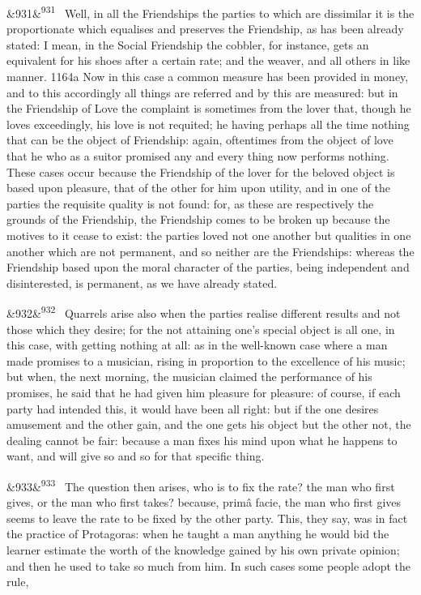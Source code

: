 \documentclass[12pt]{article}
\newcommand{\para}[1][]{\par\noindent\ifx&#1&\else\textsuperscript{\footnotesize #1}~\fi}
\begin{document}
\para[931] Well, in all the Friendships the parties to which are dissimilar it is the proportionate which equalises and preserves the Friendship, as has been already stated: I mean, in the Social Friendship the cobbler, for instance, gets an equivalent for his shoes after a certain rate; and the weaver, and all others in like manner. 1164a Now in this case a common measure has been provided in money, and to this accordingly all things are referred and by this are measured: but in the Friendship of Love the complaint is sometimes from the lover that, though he loves exceedingly, his love is not requited; he having perhaps all the time nothing that can be the object of Friendship: again, oftentimes from the object of love that he who as a suitor promised any and every thing now performs nothing. These cases occur because the Friendship of the lover for the beloved object is based upon pleasure, that of the other for him upon utility, and in one of the parties the requisite quality is not found: for, as these are respectively the grounds of the Friendship, the Friendship comes to be broken up because the motives to it cease to exist: the parties loved not one another but qualities in one another which are not permanent, and so neither are the Friendships: whereas the Friendship based upon the moral character of the parties, being independent and disinterested, is permanent, as we have already stated.

\para[932] Quarrels arise also when the parties realise different results and not those which they desire; for the not attaining one's special object is all one, in this case, with getting nothing at all: as in the well-known case where a man made promises to a musician, rising in proportion to the excellence of his music; but when, the next morning, the musician claimed the performance of his promises, he said that he had given him pleasure for pleasure: of course, if each party had intended this, it would have been all right: but if the one desires amusement and the other gain, and the one gets his object but the other not, the dealing cannot be fair: because a man fixes his mind upon what he happens to want, and will give so and so for that specific thing.

\para[933] The question then arises, who is to fix the rate? the man who first gives, or the man who first takes? because, primâ facie, the man who first gives seems to leave the rate to be fixed by the other party. This, they say, was in fact the practice of Protagoras: when he taught a man anything he would bid the learner estimate the worth of the knowledge gained by his own private opinion; and then he used to take so much from him. In such cases some people adopt the rule,
\end{document}
